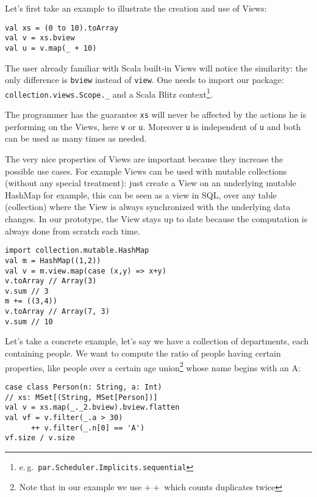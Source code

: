 \documentclass[a4paper,12pt,twocolumn]{article}
\newcommand{\eg}{e.\,g.\ }
\begin{document}
Let's first take an example to illustrate the creation and use of Views:

\begin{lstlisting}
val xs = (0 to 10).toArray
val v = xs.bview
val u = v.map(_ + 10)
\end{lstlisting}

The user already familiar with Scala built-in Views will notice the similarity: the only difference is \verb|bview| instead of \verb|view|.
One needs to import our package: \verb|collection.views.Scope._| and a Scala Blitz context\footnote{\eg {\tt par.Scheduler.Implicits.sequential}}.

The programmer has the guarantee \verb|xs| will never be affected by the actions he is performing on the Views, here \verb|v| or \verb|u|.
Moreover \verb|u| is independent of \verb|u| and both can be used as many times as needed.

The very nice properties of Views are important because they increase the possible use cases.
For example Views can be used with mutable collections (without any special treatment): just create a View on an underlying mutable HashMap for example, this can be seen as a view in SQL, over any table (collection) where the View is always synchronized with the underlying data changes.
In our prototype, the View stays up to date because the computation is always done from scratch each time.

\begin{lstlisting}
import collection.mutable.HashMap
val m = HashMap((1,2))
val v = m.view.map(case (x,y) => x+y)
v.toArray // Array(3)
v.sum // 3
m += ((3,4))
v.toArray // Array(7, 3)
v.sum // 10
\end{lstlisting}

Let's take a concrete example, let's say we have a collection of departments, each containing people.
We want to compute the ratio of people having certain properties, like people over a certain age union\footnote{Note that in our example we use $++$ which counts duplicates twice} whose name begins with an A:

\begin{lstlisting}
case class Person(n: String, a: Int)
// xs: MSet[(String, MSet[Person])]
val v = xs.map(_._2.bview).bview.flatten
val vf = v.filter(_.a > 30)
      ++ v.filter(_.n[0] == 'A')
vf.size / v.size
\end{lstlisting}
\end{document}
